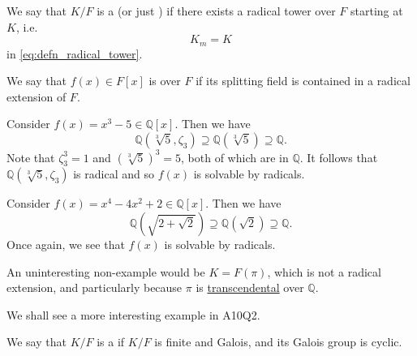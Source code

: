 \documentclass[notoc,notitlepage,nobib]{tufte-book}
\begin{document}
\begin{defn}\label{defn:radical_extension}
  We say that $K / F$ is a  (or just
  ) if there exists a radical tower over $F$ starting at $K$,
  i.e.
  \begin{equation*}
    K_m = K
  \end{equation*}
  in \cref{eq:defn_radical_tower}.
\end{defn}

\begin{defn}\label{defn:solvable_by_radicals}
  We say that $f(x) \in F[x]$ is  over $F$ if its
  splitting field is contained in a radical extension of $F$.
\end{defn}

\begin{eg}
  Consider $f(x) = x^3 - 5 \in \mathbb{Q}[x]$. Then we have
  \begin{equation*}
    \mathbb{Q}(\sqrt[3]{5}, \zeta_3) \supseteq \mathbb{Q}(\sqrt[3]{5}) \supseteq
    \mathbb{Q}.
  \end{equation*}
  Note that $\zeta_3^3 = 1$ and $\left( \sqrt[3]{5} \right)^3 = 5$, both of
  which are in $\mathbb{Q}$. It follows that $\mathbb{Q}(\sqrt[3]{5}, \zeta_3)$ 
  is radical and so $f(x)$ is solvable by radicals.
\end{eg}

\begin{eg}
  Consider $f(x) = x^4 - 4x^2 + 2 \in \mathbb{Q}[x]$. Then we have
  \begin{equation*}
    \mathbb{Q}(\sqrt{2 + \sqrt{2}}) \supseteq \mathbb{Q}(\sqrt{2}) \supseteq
    \mathbb{Q}.
  \end{equation*}
  Once again, we see that $f(x)$ is solvable by radicals.
\end{eg}

An uninteresting non-example would be $K = F(\pi)$, which is not a radical
extension, and particularly because $\pi$ is
\hyperref[defn:algebraic_and_transcendental]{transcendental} over $\mathbb{Q}$.

We shall see a more interesting example in A10Q2.

\begin{defn}\label{defn:cyclic_extension}
  We say that $K / F$ is a  if $K / F$ is finite and
  Galois, and its Galois group is cyclic.
\end{defn}
\end{document}
